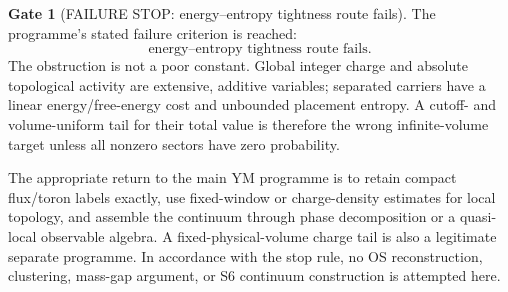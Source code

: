 \documentclass[11pt]{article}
\theoremstyle{definition}
\newtheorem{gate}[theorem]{Gate}
\theoremstyle{remark}
\begin{document}
\begin{gate}[FAILURE STOP: energy--entropy tightness route fails]
\label{gate:sector-failure-stop}
The programme's stated failure criterion is reached:
\[
 \boxed{\text{energy--entropy tightness route fails}.}       \tag{6.17}
\]
The obstruction is not a poor constant.  Global integer charge and absolute
topological activity are extensive, additive variables; separated carriers
have a linear energy/free-energy cost and unbounded placement entropy.  A
cutoff- and volume-uniform tail for their total value is therefore the wrong
infinite-volume target unless all nonzero sectors have zero probability.

The appropriate return to the main YM programme is to retain compact
flux/toron labels exactly, use fixed-window or charge-density estimates for
local topology, and assemble the continuum through phase decomposition or a
quasi-local observable algebra.  A fixed-physical-volume charge tail is also
a legitimate separate programme.  In accordance with the stop rule, no OS
reconstruction, clustering, mass-gap argument, or S6 continuum construction
is attempted here.
\end{gate}
\end{document}

